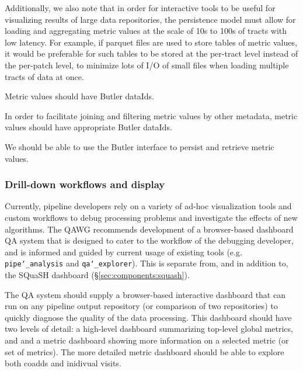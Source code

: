 Additionally, we also note that in order for interactive tools to be useful for visualizing results of large data repositories, the persistence model must allow for loading and aggregating metric values at the scale of 10s to 100s of tracts with low latency.
For example, if parquet files are used to store tables of metric values, it would be preferable for such tables to be stored at the per-tract level instead of the per-patch level, to minimize lots of I/O of small files when loading multiple tracts of data at once.


\begin{recommendation}
Metric values should have Butler dataIds.
\end{recommendation}

In order to facilitate joining and filtering metric values by other metadata, metric values should have appropriate Butler dataIds.

\begin{recommendation}
We should be able to use the Butler interface to persist and retrieve metric values.
\end{recommendation}

\subsubsection{Drill-down workflows and display} \label{sec:metric_displays}

Currently, pipeline developers rely on a variety of ad-hoc visualization tools and custom workflows to debug processing problems and investigate the effects of new algorithms.
The QAWG recommends development of a browser-based dashboard QA system that is designed to cater to the workflow of the debugging developer, and is informed and guided by current usage of existing tools (e.g. \texttt{pipe\char`_analysis} and \texttt{qa\char`_explorer}).
This is separate from, and in addition to, the SQuaSH dashboard (\S \ref{sec:components:squash}).

\begin{recommendation}
The QA system should supply a browser-based interactive dashboard that can run on any pipeline output repository (or comparison of two repositories) to quickly diagnose the quality of the data processing.
This dashboard should have two levels of detail: a high-level dashboard summarizing top-level global metrics, and and a metric dashboard showing more information on a selected metric (or set of metrics).  The more detailed metric dashboard should be able to explore both coadds and inidivual visits.
\end{recommendation}

